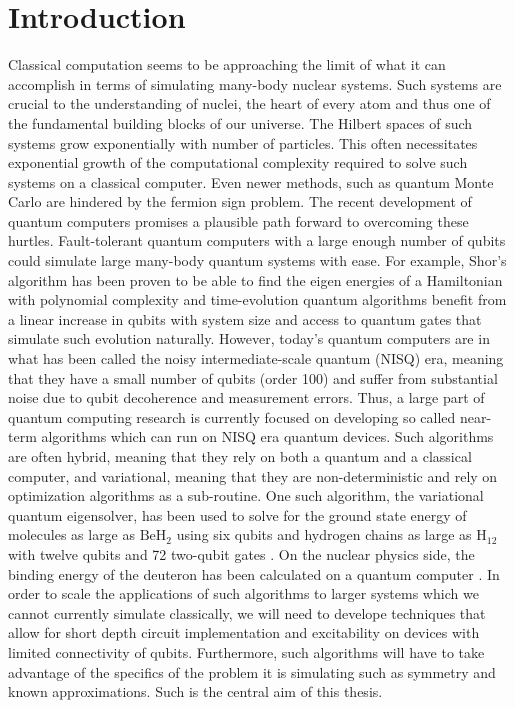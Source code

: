 \documentclass[Dual]{msu-thesis}
\begin{document}
\chapter{Introduction}  

Classical computation seems to be approaching the limit of what it can accomplish in terms of simulating many-body nuclear systems. Such systems are crucial to the understanding of nuclei, the heart of every atom and thus one of the fundamental building blocks of our universe. The Hilbert spaces of such systems grow exponentially with number of particles. This often necessitates exponential growth of the computational complexity required to solve such systems on a classical computer. Even newer methods, such as quantum Monte Carlo are hindered by the fermion sign problem. The recent development of quantum computers promises a plausible path forward to overcoming these hurtles. Fault-tolerant quantum computers with a large enough number of qubits could simulate large many-body quantum systems with ease. For example, Shor's algorithm has been proven to be able to find the eigen energies of a Hamiltonian with polynomial complexity and time-evolution quantum algorithms benefit from a linear increase in qubits with system size and access to quantum gates that simulate such evolution naturally. However, today's quantum computers are in what has been called the noisy intermediate-scale quantum (NISQ) era, meaning that they have a small number of qubits (order 100) and suffer from substantial noise due to qubit decoherence and measurement errors. Thus, a large part of quantum computing research is currently focused on developing so called near-term algorithms which can run on NISQ era quantum devices. Such algorithms are often hybrid, meaning that they rely on both a quantum and a classical computer, and variational, meaning that they are non-deterministic and rely on optimization algorithms as a sub-routine. One such algorithm, the variational quantum eigensolver, has been used to solve for the ground state energy of molecules as large as $\text{BeH}_2$ \cite{beh2} using six qubits and hydrogen chains as large as $\text{H}_{12}$ with twelve qubits and 72 two-qubit gates \cite{h12}. On the nuclear physics side, the binding energy of the deuteron has been calculated on a quantum computer \cite{deuteron}. In order to scale the applications of such algorithms to larger systems which we cannot currently simulate classically, we will need to develope techniques that allow for short depth circuit implementation and excitability on devices with limited connectivity of qubits. Furthermore, such algorithms will have to take advantage of the specifics of the problem it is simulating such as symmetry and known approximations. Such is the central aim of this thesis. 
\end{document}
